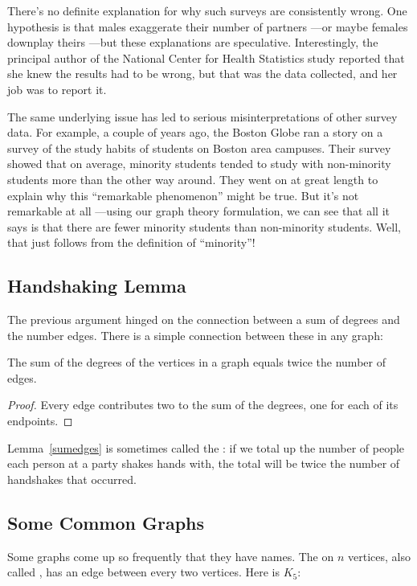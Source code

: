 There's no definite explanation for why such surveys are consistently
wrong.  One hypothesis is that males exaggerate their number of partners
---or maybe females downplay theirs ---but these explanations are
speculative.  Interestingly, the principal author of the National Center
for Health Statistics study reported that she knew the results had to be
wrong, but that was the data collected, and her job was to report it.

The same underlying issue has led to serious misinterpretations of other
survey data.  For example, a couple of years ago, the Boston Globe ran a
story on a survey of the study habits of students on Boston area campuses.
Their survey showed that on average, minority students tended to study
with non-minority students more than the other way around.  They went on
at great length to explain why this ``remarkable phenomenon'' might be
true.  But it's not remarkable at all ---using our graph theory
formulation, we can see that all it says is that there are fewer minority
students than non-minority students.  Well, that just follows from the
definition of ``minority''!

\subsection{Handshaking Lemma}
The previous argument hinged on the connection between a sum of degrees
and the number edges.  There is a simple connection between these in any
graph:

\begin{lemma}\label{sumedges}
The sum of the degrees of the vertices in a graph equals twice the number
of edges.
\end{lemma}

\begin{proof}
Every edge contributes two to the sum of the degrees, one for each of its
endpoints.
\end{proof}

Lemma~\ref{sumedges} is sometimes called the :
if we total up the number of people each person at a party shakes hands
with, the total will be twice the number of handshakes that occurred.

\subsection{Some Common Graphs}
Some graphs come up so frequently that they have names.  The
 on $n$ vertices, also called , has an edge
between every two vertices.  Here is $K_5$:

